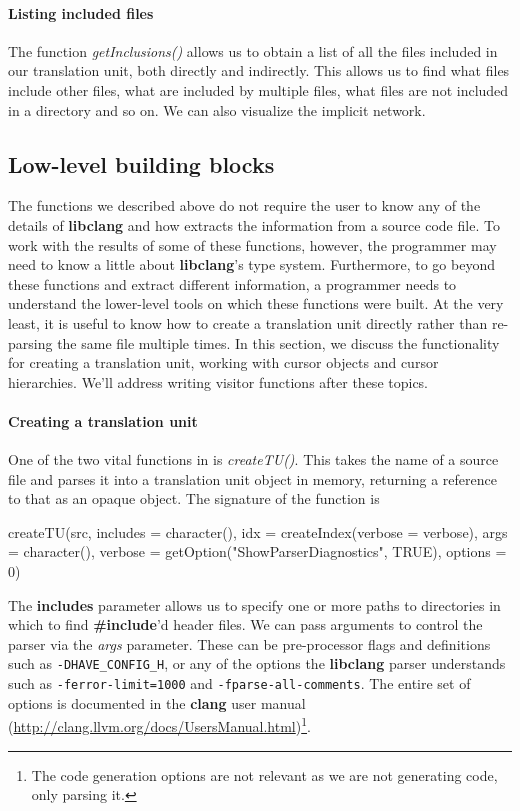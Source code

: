 \documentclass[article]{jss}
\def\R{\proglang{R}}
\def\Rpkg#1{\pkg{#1}}
\def\Rfunc#1{\textsl{#1()}}
\def\Rvar#1{\textsl{#1}}
\def\Rarg#1{\textbf{#1}}
\def\Ckeyword#1{\textbf{#1}}
\def\libclang{\textbf{libclang}}
\def\clang{\textbf{clang}}
\def\libclangFlag#1{-\nolinebreak\texttt{#1}}
\begin{document}
\paragraph{Listing included files}
The function \Rfunc{getInclusions} allows us to obtain a list of all
the files included in our translation unit, both directly and
indirectly.  This allows us to find what files include other files,
what are included by multiple files, what files are not included in a
directory and so on. We can also visualize the implicit network.


\subsection{Low-level building blocks}\label{sec:BuildingBlocks}

The functions we described above do not require the user to know any
of the details of \libclang{} and how \Rpkg{RCIndex} extracts the
information from a source code file.  To work with the results of some
of these functions, however, the \R{} programmer may need to know a
little about \libclang's type system. Furthermore, to go beyond these
functions and extract different information, a programmer needs to
understand the lower-level tools on which these functions were built.
At the very least, it is useful to know how to create a translation
unit directly rather than re-parsing the same file multiple times.  In
this section, we discuss the functionality for creating a translation
unit, working with cursor objects and cursor hierarchies.  We'll
address writing visitor functions after these topics.



\paragraph{Creating a translation unit} 
One of the two vital functions in \Rpkg{RCIndex} is \Rfunc{createTU}.
This takes the name of a source file and parses it into a translation
unit object in memory, returning a reference to that as an opaque \R{}
object.
The signature of the function is 
\begin{RCode}
createTU(src, includes = character(), 
         idx = createIndex(verbose = verbose), 
         args = character(), 
         verbose = getOption("ShowParserDiagnostics", TRUE), options = 0)   
\end{RCode}
The \Rarg{includes} parameter allows us to specify one or more paths
to directories in which to find \Ckeyword{\#include}'d header files. We
can pass arguments to control the parser via the \Rvar{args}
parameter. These can be pre-processor flags and definitions such as
\verb+-DHAVE_CONFIG_H+, or any of the options the \libclang{} parser
understands such as \texttt{-ferror-limit=1000} %
and
\mbox{\texttt{-fparse-all-comments}}. %
The entire set of options is documented in
the \clang{} user manual
(\url{http://clang.llvm.org/docs/UsersManual.html})\footnote{The code
  generation options are not relevant as we are not generating code,
  only parsing it.}.
\end{document}
